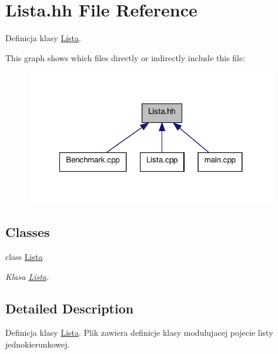 \hypertarget{a00010}{\section{Lista.\-hh File Reference}
\label{a00010}
}


Definicja klasy \hyperlink{a00003}{Lista}.  


This graph shows which files directly or indirectly include this file\-:\nopagebreak
\begin{figure}[H]
\begin{center}
\leavevmode
\includegraphics[width=312pt]{a00021}
\end{center}
\end{figure}
\subsection*{Classes}
\begin{DoxyCompactItemize}
\item 
class \hyperlink{a00003}{Lista}
\begin{DoxyCompactList}\small\item\em Klasa \hyperlink{a00003}{Lista}. \end{DoxyCompactList}\end{DoxyCompactItemize}


\subsection{Detailed Description}
Definicja klasy \hyperlink{a00003}{Lista}. Plik zawiera definicje klasy modulujacej pojecie listy jednokierunkowej. 